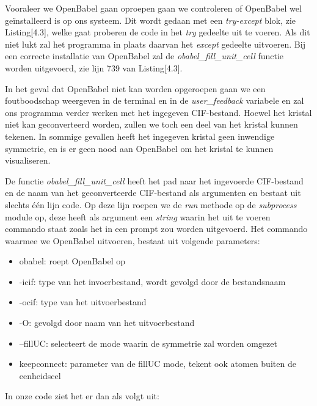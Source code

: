 

Vooraleer we OpenBabel gaan oproepen gaan we controleren of OpenBabel wel geïnstalleerd is op ons systeem. Dit wordt gedaan met een \textit{try-except} blok, zie Listing[4.3], welke gaat proberen de code in het \textit{try} gedeelte uit te voeren. Als dit niet lukt zal het programma in plaats daarvan het \textit{except} gedeelte uitvoeren. Bij een correcte installatie van OpenBabel zal de \textit{obabel\_fill\_unit\_cell} functie worden uitgevoerd, zie lijn 739 van Listing[4.3].
\par
In het geval dat OpenBabel niet kan worden opgeroepen gaan we een foutboodschap weergeven in de terminal en in de \textit{user\_feedback} variabele en zal ons programma verder werken met het ingegeven CIF-bestand. Hoewel het kristal niet kan geconverteerd worden, zullen we toch een deel van het kristal kunnen tekenen. In sommige gevallen heeft het ingegeven kristal geen inwendige symmetrie, en is er geen nood aan OpenBabel om het kristal te kunnen visualiseren.


\par	
De functie \textit{obabel\_fill\_unit\_cell} heeft het pad naar het ingevoerde CIF-bestand en de naam van het geconverteerde CIF-bestand als argumenten en bestaat uit slechts één lijn code. Op deze lijn roepen we de \textit{run} methode op de \textit{subprocess} module op, deze heeft als argument een \textit{string} waarin het uit te voeren commando staat zoals het in een prompt zou worden uitgevoerd. Het commando waarmee we OpenBabel uitvoeren, bestaat uit volgende parameters:
\begin{itemize}
\item obabel: roept OpenBabel op
\item -icif: type van het invoerbestand, wordt gevolgd door de bestandsnaam
\item -ocif: type van het uitvoerbestand
\item -O: gevolgd door naam van het uitvoerbestand
\item --fillUC: selecteert de mode waarin de symmetrie zal worden omgezet
\item keepconnect: parameter van de fillUC mode, tekent ook atomen buiten de eenheidscel
\end{itemize}
In onze code ziet het er dan als volgt uit:


